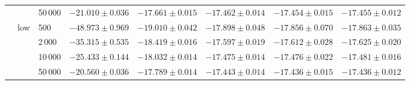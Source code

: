 \begin{tabular}{@{}lllrrrrr@{}}
 &  & 50\,000 & $-21.010 \pm 0.036$ & $-17.661 \pm 0.015$ & $-17.462 \pm 0.014$ & $-17.454 \pm 0.015$ & $-17.455 \pm 0.012$ \\
 & low & 500 & $-48.973 \pm 0.969$ & $-19.010 \pm 0.042$ & $-17.898 \pm 0.048$ & $-17.856 \pm 0.070$ & $-17.863 \pm 0.035$ \\
 &  & 2\,000 & $-35.315 \pm 0.535$ & $-18.419 \pm 0.016$ & $-17.597 \pm 0.019$ & $-17.612 \pm 0.028$ & $-17.625 \pm 0.020$ \\
 &  & 10\,000 & $-25.433 \pm 0.144$ & $-18.032 \pm 0.014$ & $-17.475 \pm 0.014$ & $-17.476 \pm 0.022$ & $-17.481 \pm 0.016$ \\
 &  & 50\,000 & $-20.560 \pm 0.036$ & $-17.789 \pm 0.014$ & $-17.443 \pm 0.014$ & $-17.436 \pm 0.015$ & $-17.436 \pm 0.012$ \\
\bottomrule
\end{tabular}
